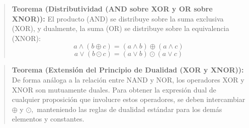 \begin{quote}\textbf{Teorema (Distributividad (AND sobre XOR y OR sobre XNOR)):}\label{dist_xor}
El producto (AND) se distribuye sobre la suma exclusiva (XOR), y dualmente, la suma (OR) se distribuye sobre la equivalencia (XNOR):
\[ a \wedge (b \oplus c) = (a \wedge b) \oplus (a \wedge c) \]
\[ a \vee (b \odot c) = (a \vee b) \odot (a \vee c) \]
\end{quote}

\begin{quote}\textbf{Teorema (Extensión del Principio de Dualidad (XOR y XNOR)):}\label{dualidad_xor_xnor}
De forma análoga a la relación entre NAND y NOR, los operadores XOR y XNOR son mutuamente duales. Para obtener la expresión dual de cualquier proposición que involucre estos operadores, se deben intercambiar $\oplus$ y $\odot,$ manteniendo las reglas de dualidad estándar para los demás elementos y constantes.
\end{quote}

